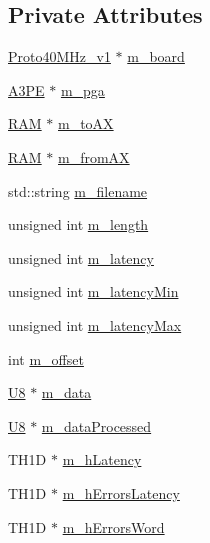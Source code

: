 \subsection*{Private Attributes}
\begin{DoxyCompactItemize}
\item 
\hyperlink{classProto40MHz__v1}{Proto40\+M\+Hz\+\_\+v1} $\ast$ \hyperlink{classA3PE__BitFlip_a2ade653b4fda5f531b5de28233cdb749}{m\+\_\+board}
\item 
\hyperlink{classA3PE}{A3\+PE} $\ast$ \hyperlink{classA3PE__BitFlip_ad20d7abccf27fa87b931cb77cd6b5e41}{m\+\_\+pga}
\item 
\hyperlink{classRAM}{R\+AM} $\ast$ \hyperlink{classA3PE__BitFlip_a0ac416167c83d423cda4e09a892b5255}{m\+\_\+to\+AX}
\item 
\hyperlink{classRAM}{R\+AM} $\ast$ \hyperlink{classA3PE__BitFlip_aad9a62adac072bed5de87406ce4cd77d}{m\+\_\+from\+AX}
\item 
std\+::string \hyperlink{classA3PE__BitFlip_a72eecaff11d66c7f3eee10a9b2bfa301}{m\+\_\+filename}
\item 
unsigned int \hyperlink{classA3PE__BitFlip_aba0564f2bb8a8ab549da428171d6a3d6}{m\+\_\+length}
\item 
unsigned int \hyperlink{classA3PE__BitFlip_a6f5ad1d6595e98c2fbd58f43e2754322}{m\+\_\+latency}
\item 
unsigned int \hyperlink{classA3PE__BitFlip_aeae11ece90351542cae8e0590d9162ee}{m\+\_\+latency\+Min}
\item 
unsigned int \hyperlink{classA3PE__BitFlip_adfeac5a7ab09d89f0d0146113dd55dde}{m\+\_\+latency\+Max}
\item 
int \hyperlink{classA3PE__BitFlip_ac0797dd65b1aeab96647d795e2f1a447}{m\+\_\+offset}
\item 
\hyperlink{classA3PE__BitFlip_ac561e6bbd8d4101ecc32016314a07581}{U8} $\ast$ \hyperlink{classA3PE__BitFlip_a06e7c01e11710261168bb0e12e2e4ac5}{m\+\_\+data}
\item 
\hyperlink{classA3PE__BitFlip_ac561e6bbd8d4101ecc32016314a07581}{U8} $\ast$ \hyperlink{classA3PE__BitFlip_a5e64d319904fc8a6fe70b92afcf6ef4f}{m\+\_\+data\+Processed}
\item 
T\+H1D $\ast$ \hyperlink{classA3PE__BitFlip_a83928ea28c555c19f4e95cf7863c1b0c}{m\+\_\+h\+Latency}
\item 
T\+H1D $\ast$ \hyperlink{classA3PE__BitFlip_a4dec854e8123271c9a624ca46c50dfd5}{m\+\_\+h\+Errors\+Latency}
\item 
T\+H1D $\ast$ \hyperlink{classA3PE__BitFlip_a0d9ea71af465c060689be4c05cba9a8e}{m\+\_\+h\+Errors\+Word}
\end{DoxyCompactItemize}
